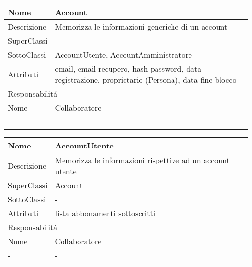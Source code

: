 \begin{center} %
    \begin{longtable}{ |p{3cm}|p{3cm}|p{3cm}|p{3cm}| }
        \hline
        Nome & \multicolumn{3}{|p{9cm}|}{Account} \\\hline
        Descrizione & \multicolumn{3}{|p{9cm}|}{Memorizza le informazioni generiche di un account} \\\hline
        SuperClassi & \multicolumn{3}{|p{9cm}|}{-} \\\hline
        SottoClassi & \multicolumn{3}{|p{9cm}|}{AccountUtente, AccountAmministratore} \\\hline
        Attributi & \multicolumn{3}{|p{9cm}|}{email, email recupero, hash password, data registrazione, proprietario (Persona), data fine blocco} \\\hline
        \multicolumn{4}{|p{12cm}|}{Responsabilit\'a} \\\hline %
        \multicolumn{2}{|p{6cm}|}{Nome} & \multicolumn{2}{|p{6cm}|}{Collaboratore} \\\hline %
        \multicolumn{2}{|p{6cm}|}{-} & \multicolumn{2}{|p{6cm}|}{-} \\\hline
    \end{longtable}
\end{center}

\begin{center} %
    \begin{longtable}{ |p{3cm}|p{3cm}|p{3cm}|p{3cm}| }
        \hline
        Nome & \multicolumn{3}{|p{9cm}|}{AccountUtente} \\\hline
        Descrizione & \multicolumn{3}{|p{9cm}|}{Memorizza le informazioni rispettive ad un account utente} \\\hline
        SuperClassi & \multicolumn{3}{|p{9cm}|}{Account} \\\hline
        SottoClassi & \multicolumn{3}{|p{9cm}|}{-} \\\hline
        Attributi & \multicolumn{3}{|p{9cm}|}{lista abbonamenti sottoscritti} \\\hline
        \multicolumn{4}{|p{12cm}|}{Responsabilit\'a} \\\hline %
        \multicolumn{2}{|p{6cm}|}{Nome} & \multicolumn{2}{|p{6cm}|}{Collaboratore} \\\hline %
        \multicolumn{2}{|p{6cm}|}{-} & \multicolumn{2}{|p{6cm}|}{-} \\\hline
    \end{longtable}
\end{center}

